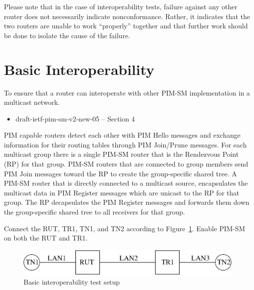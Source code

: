 \documentclass[11pt]{report}
\begin{document}
Please note that in the case of interoperability tests, failure against any
other router does not necessarily indicate nonconformance. Rather, it
indicates that the two routers are unable to work ``properly'' together and
that further work should be done to isolate the cause of the failure.

\newpage
\section{Basic Interoperability}

To ensure that a router can interoperate with other PIM-SM
implementation in a multicast network.

\begin{itemize}
  \item draft-ietf-pim-sm-v2-new-05 -- Section 4
\end{itemize}

PIM capable routers detect each other with PIM Hello
messages and exchange information for their routing tables through
PIM Join/Prune messages. For each multicast group there is a single PIM-SM
router that is the Rendezvous Point (RP) for that group. PIM-SM routers that
are connected to group members send PIM Join messages toward the RP to create
the group-specific shared tree. A PIM-SM router that is directly connected to
a multicast source, encapsulates the multicast data in PIM Register messages
which are unicast to the RP for that group. The RP decapsulates the
PIM Register messages and forwards them down the group-specific shared tree to
all receivers for that group.

Connect the RUT, TR1, TN1, and TN2 according to
Figure~\ref{fig:pim_test_1_1_basic_interoperability}.
Enable PIM-SM on both the RUT and TR1.

\begin{figure}[htbp]
  \begin{center}
    \includegraphics[scale=0.8]{figs/pim_test_1_1_basic_interoperability}
    \caption{Basic interoperability test setup}
    \label{fig:pim_test_1_1_basic_interoperability}
  \end{center}
\end{figure}
\end{document}
